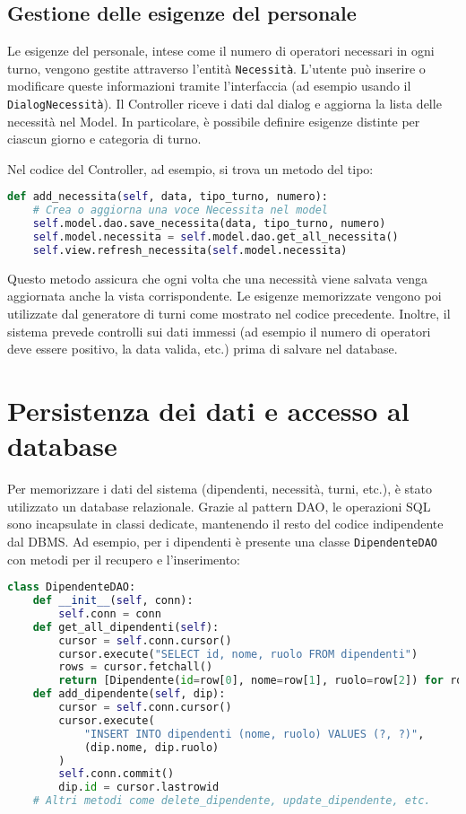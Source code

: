 \documentclass[a4paper,12pt]{report}
\begin{document}
\section{Gestione delle esigenze del personale}
Le esigenze del personale, intese come il numero di operatori necessari in ogni turno, vengono gestite attraverso l'entit\`a \texttt{Necessit\`a}. L'utente pu\`o inserire o modificare queste informazioni tramite l'interfaccia (ad esempio usando il \texttt{DialogNecessit\`a}). Il Controller riceve i dati dal dialog e aggiorna la lista delle necessit\`a nel Model. In particolare, \`e possibile definire esigenze distinte per ciascun giorno e categoria di turno.

Nel codice del Controller, ad esempio, si trova un metodo del tipo:
\begin{lstlisting}[language=Python]
def add_necessita(self, data, tipo_turno, numero):
    # Crea o aggiorna una voce Necessita nel model
    self.model.dao.save_necessita(data, tipo_turno, numero)
    self.model.necessita = self.model.dao.get_all_necessita()
    self.view.refresh_necessita(self.model.necessita)
\end{lstlisting}
Questo metodo assicura che ogni volta che una necessit\`a viene salvata venga aggiornata anche la vista corrispondente. Le esigenze memorizzate vengono poi utilizzate dal generatore di turni come mostrato nel codice precedente. Inoltre, il sistema prevede controlli sui dati immessi (ad esempio il numero di operatori deve essere positivo, la data valida, etc.) prima di salvare nel database.

\chapter{Persistenza dei dati e accesso al database}
\label{cap:persistenza}
Per memorizzare i dati del sistema (dipendenti, necessit\`a, turni, etc.), \`e stato utilizzato un database relazionale. Grazie al pattern DAO, le operazioni SQL sono incapsulate in classi dedicate, mantenendo il resto del codice indipendente dal DBMS. Ad esempio, per i dipendenti \`e presente una classe \texttt{DipendenteDAO} con metodi per il recupero e l'inserimento:
\begin{lstlisting}[language=Python]
class DipendenteDAO:
    def __init__(self, conn):
        self.conn = conn
    def get_all_dipendenti(self):
        cursor = self.conn.cursor()
        cursor.execute("SELECT id, nome, ruolo FROM dipendenti")
        rows = cursor.fetchall()
        return [Dipendente(id=row[0], nome=row[1], ruolo=row[2]) for row in rows]
    def add_dipendente(self, dip):
        cursor = self.conn.cursor()
        cursor.execute(
            "INSERT INTO dipendenti (nome, ruolo) VALUES (?, ?)",
            (dip.nome, dip.ruolo)
        )
        self.conn.commit()
        dip.id = cursor.lastrowid
    # Altri metodi come delete_dipendente, update_dipendente, etc.
\end{lstlisting}
\end{document}
